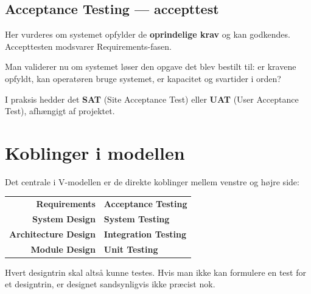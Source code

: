 \documentclass[12pt, a4paper]{article}
\begin{document}
\subsection{Acceptance Testing --- accepttest}

Her vurderes om systemet opfylder de \textbf{oprindelige krav} og kan godkendes.
Accepttesten modsvarer Requirements-fasen.

Man validerer nu om systemet løser den opgave det blev bestilt til: er kravene opfyldt, kan operatøren bruge systemet, er kapacitet og svartider i orden?

I praksis hedder det \textbf{SAT} (Site Acceptance Test) eller \textbf{UAT} (User Acceptance Test), afhængigt af projektet.

\section{Koblinger i modellen}

Det centrale i V-modellen er de direkte koblinger mellem venstre og højre side:

\vspace{0.4cm}
\begin{center}
\begin{tcolorbox}[
  enhanced,
  colback=lightgray,
  colframe=primaryblue,
  arc=4pt,
  boxrule=1pt,
  width=11cm,
]
\begin{tabular}{r@{\quad\textcolor{accentblue}{$\leftrightarrow$}\quad}l}
  \textbf{Requirements}      & \textbf{Acceptance Testing} \\[4pt]
  \textbf{System Design}     & \textbf{System Testing}     \\[4pt]
  \textbf{Architecture Design} & \textbf{Integration Testing} \\[4pt]
  \textbf{Module Design}     & \textbf{Unit Testing}       \\
\end{tabular}
\end{tcolorbox}
\end{center}
\vspace{0.4cm}

Hvert designtrin skal altså kunne testes.
Hvis man ikke kan formulere en test for et designtrin, er designet sandsynligvis ikke præcist nok.
\end{document}
